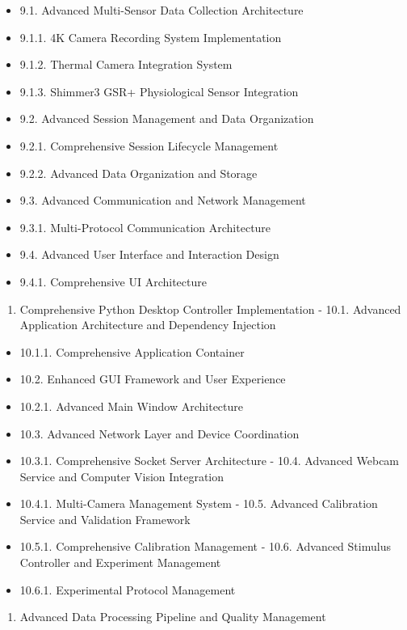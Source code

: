 \documentclass[11pt,a4paper]{report}
\begin{document}
\begin{itemize}
\item 9.1. Advanced Multi-Sensor Data Collection Architecture
\item 9.1.1. 4K Camera Recording System Implementation
\item 9.1.2. Thermal Camera Integration System
\item 9.1.3. Shimmer3 GSR+ Physiological Sensor Integration
\item 9.2. Advanced Session Management and Data Organization
\item 9.2.1. Comprehensive Session Lifecycle Management
\item 9.2.2. Advanced Data Organization and Storage
\item 9.3. Advanced Communication and Network Management
\item 9.3.1. Multi-Protocol Communication Architecture
\item 9.4. Advanced User Interface and Interaction Design
\item 9.4.1. Comprehensive UI Architecture
\end{itemize}
\begin{enumerate}
\item Comprehensive Python Desktop Controller Implementation
    -
    10.1. Advanced Application Architecture and Dependency Injection
\end{enumerate}
\begin{itemize}
\item 10.1.1. Comprehensive Application Container
\item 10.2. Enhanced GUI Framework and User Experience
\item 10.2.1. Advanced Main Window Architecture
\item 10.3. Advanced Network Layer and Device Coordination
\item 10.3.1. Comprehensive Socket Server Architecture
    -
    10.4. Advanced Webcam Service and Computer Vision Integration
\item 10.4.1. Multi-Camera Management System
    -
    10.5. Advanced Calibration Service and Validation Framework
\item 10.5.1. Comprehensive Calibration Management
    -
    10.6. Advanced Stimulus Controller and Experiment Management
\item 10.6.1. Experimental Protocol Management
\end{itemize}
\begin{enumerate}
\item Advanced Data Processing Pipeline and Quality Management
\end{enumerate}
\end{document}
